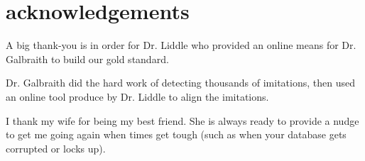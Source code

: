 \section{acknowledgements}
\label{acknowledgements}
A big thank-you is in order for Dr. Liddle who provided an online means for Dr. Galbraith to build our gold standard. 

Dr. Galbraith did the hard work of detecting thousands of imitations, then used an online tool produce by Dr. Liddle to align the imitations.

I thank my wife for being my best friend. She is always ready to provide a nudge to get me going again when times get tough (such as when your database gets corrupted or locks up).
